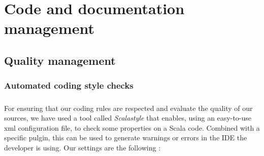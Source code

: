 \documentclass{report}
\begin{document}
\chapter{Code and documentation management}

\section{Quality management}

\subsection{Automated coding style checks}

\paragraph{}
\hspace{4mm}\textnormal{For ensuring that our coding rules are respected and evaluate the quality of our sources, we have
used a tool called \textit{Scalastyle} that enables, using an easy-to-use xml configuration file, to check
some properties on a Scala code. Combined with a specific pulgin, this can be used to generate warnings or errors
in the IDE the developer is using. Our settings are the following :}
\end{document}
